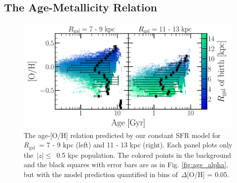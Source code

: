 \documentclass[draft2.tex]{subfiles}
\begin{document}

\subsection{The Age-Metallicity Relation} 
\label{sec:obs_comp:amr} 

\begin{figure} 
\centering 
\includegraphics[scale = 0.35]{amr_static_o.pdf} 
\caption{The age-[O/H] relation predicted by our constant SFR model for 
$R_\text{gal}$~= 7 - 9 kpc (left) and 11 - 13 kpc (right). Each panel plots 
only the~$\left|z\right|\leq$~0.5 kpc population. The colored points in the 
background and the black squares with error bars are as in Fig. 
\ref{fig:age_alpha}, but with the model prediction quantified in bins 
of~$\Delta$[O/H] = 0.05. } 
\label{fig:age_oh_static} 
\end{figure} 
\end{document}
